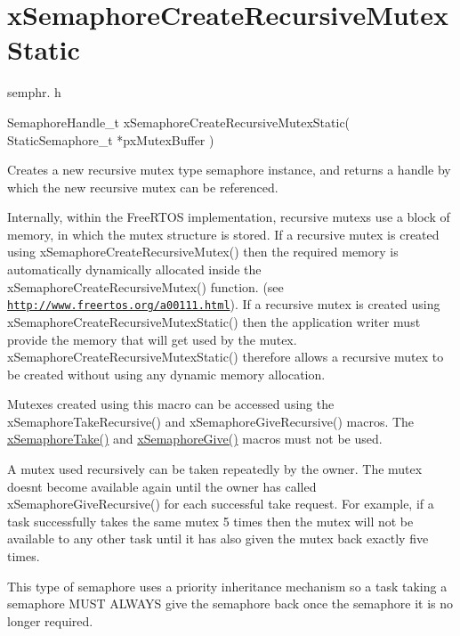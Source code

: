 \hypertarget{group__xSemaphoreCreateRecursiveMutexStatic}{}\section{x\+Semaphore\+Create\+Recursive\+Mutex\+Static}
\label{group__xSemaphoreCreateRecursiveMutexStatic}
semphr. h 
\begin{DoxyPre}SemaphoreHandle\_t xSemaphoreCreateRecursiveMutexStatic( StaticSemaphore\_t *pxMutexBuffer )\end{DoxyPre}


Creates a new recursive mutex type semaphore instance, and returns a handle by which the new recursive mutex can be referenced.

Internally, within the Free\+R\+T\+OS implementation, recursive mutexs use a block of memory, in which the mutex structure is stored. If a recursive mutex is created using x\+Semaphore\+Create\+Recursive\+Mutex() then the required memory is automatically dynamically allocated inside the x\+Semaphore\+Create\+Recursive\+Mutex() function. (see \href{http://www.freertos.org/a00111.html}{\tt http\+://www.\+freertos.\+org/a00111.\+html}). If a recursive mutex is created using x\+Semaphore\+Create\+Recursive\+Mutex\+Static() then the application writer must provide the memory that will get used by the mutex. x\+Semaphore\+Create\+Recursive\+Mutex\+Static() therefore allows a recursive mutex to be created without using any dynamic memory allocation.

Mutexes created using this macro can be accessed using the x\+Semaphore\+Take\+Recursive() and x\+Semaphore\+Give\+Recursive() macros. The \hyperlink{semphr_8h_af116e436d2a5ae5bd72dbade2b5ea930}{x\+Semaphore\+Take()} and \hyperlink{semphr_8h_aae55761cabfa9bf85c8f4430f78c0953}{x\+Semaphore\+Give()} macros must not be used.

A mutex used recursively can be \textquotesingle{}taken\textquotesingle{} repeatedly by the owner. The mutex doesn\textquotesingle{}t become available again until the owner has called x\+Semaphore\+Give\+Recursive() for each successful \textquotesingle{}take\textquotesingle{} request. For example, if a task successfully \textquotesingle{}takes\textquotesingle{} the same mutex 5 times then the mutex will not be available to any other task until it has also \textquotesingle{}given\textquotesingle{} the mutex back exactly five times.

This type of semaphore uses a priority inheritance mechanism so a task \textquotesingle{}taking\textquotesingle{} a semaphore M\+U\+ST A\+L\+W\+A\+YS \textquotesingle{}give\textquotesingle{} the semaphore back once the semaphore it is no longer required.

